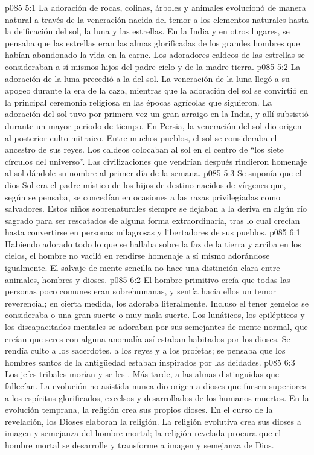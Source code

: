 \vs p085 5:1 La adoración de rocas, colinas, árboles y animales evolucionó de manera natural a través de la veneración nacida del temor a los elementos naturales hasta la deificación del sol, la luna y las estrellas. En la India y en otros lugares, se pensaba que las estrellas eran las almas glorificadas de los grandes hombres que habían abandonado la vida en la carne. Los adoradores caldeos de las estrellas se consideraban a sí mismos hijos del padre cielo y de la madre tierra.
\vs p085 5:2 La adoración de la luna precedió a la del sol. La veneración de la luna llegó a su apogeo durante la era de la caza, mientras que la adoración del sol se convirtió en la principal ceremonia religiosa en las épocas agrícolas que siguieron. La adoración del sol tuvo por primera vez un gran arraigo en la India, y allí subsistió durante un mayor periodo de tiempo. En Persia, la veneración del sol dio origen al posterior culto mitraico. Entre muchos pueblos, el sol se consideraba el ancestro de sus reyes. Los caldeos colocaban al sol en el centro de “los siete círculos del universo”. Las civilizaciones que vendrían después rindieron homenaje al sol dándole su nombre al primer día de la semana.
\vs p085 5:3 Se suponía que el dios Sol era el padre místico de los hijos de destino nacidos de vírgenes que, según se pensaba, se concedían en ocasiones a las razas privilegiadas como salvadores. Estos niños sobrenaturales siempre se dejaban a la deriva en algún río sagrado para ser rescatados de alguna forma extraordinaria, tras lo cual crecían hasta convertirse en personas milagrosas y libertadores de sus pueblos.
\vs p085 6:1 Habiendo adorado todo lo que se hallaba sobre la faz de la tierra y arriba en los cielos, el hombre no vaciló en rendirse homenaje a sí mismo adorándose igualmente. El salvaje de mente sencilla no hace una distinción clara entre animales, hombres y dioses.
\vs p085 6:2 El hombre primitivo creía que todas las personas poco comunes eran sobrehumanas, y sentía hacia ellos un temor reverencial; en cierta medida, los adoraba literalmente. Incluso el tener gemelos se consideraba o una gran suerte o muy mala suerte. Los lunáticos, los epilépticos y los discapacitados mentales se adoraban por sus semejantes de mente normal, que creían que seres con alguna anomalía así estaban habitados por los dioses. Se rendía culto a los sacerdotes, a los reyes y a los profetas; se pensaba que los hombres santos de la antigüedad estaban inspirados por las deidades.
\vs p085 6:3 Los jefes tribales morían y se les . Más tarde,  a las almas distinguidas que fallecían. La evolución no asistida nunca dio origen a dioses que fuesen superiores a los espíritus glorificados, excelsos y desarrollados de los humanos muertos. En la evolución temprana, la religión crea sus propios dioses. En el curso de la revelación, los Dioses elaboran la religión. La religión evolutiva crea sus dioses a imagen y semejanza del hombre mortal; la religión revelada procura que el hombre mortal se desarrolle y transforme a imagen y semejanza de Dios.
